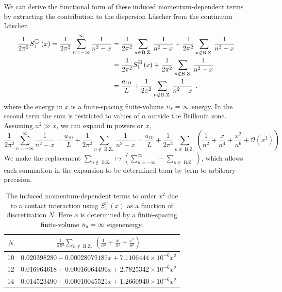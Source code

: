 We can derive the functional form of these induced momentum-dependent terms by extracting the contribution to the dispersion L\"uscher from the continuum L\"uscher.
\begin{align*}
 \frac{1}{2 \pi^{2}} S^\bigcirc_{1}\left(x\right)=\frac{1}{2 \pi^{2}} \sum_{n=-\infty}^{\infty} \frac{1}{n^{2}-x} &=\frac{1}{2 \pi^{2}} \sum_{n\in \operatorname{B.Z.}} \frac{1}{n^{2}-x} +\frac{1}{2 \pi^{2}} \sum_{n\notin \operatorname{B.Z.}} \frac{1}{n^{2}-x} \\
 &= \frac{1}{2 \pi^{2}} S^{\boxplus}_{1}\left(x\right)+\frac{1}{2 \pi^{2}} \sum_{n\notin \operatorname{B.Z.}} \frac{1}{n^{2}-x}\\
&=\frac{a_{10}}{L}+\frac{1}{2 \pi^{2}} \sum_{n\notin \operatorname{B.Z.}} \frac{1}{n^{2}-x} \ .
\end{align*}
where the energy in $x$ is a finite-spacing finite-volume ${n_s}=\infty$ energy.
In the second term the sum is restricted to values of $n$ outside the Brillouin zone.
Assuming $n^2\gg x$, we can expand in powers or $x$,
\begin{equation}
    \frac{1}{2 \pi^{2}} \sum_{n=-\infty}^{\infty} \frac{1}{n^{2}-x}
        =
    \frac{a_{10}}{L}+\frac{1}{2 \pi^{2}} \sum_{n\notin \operatorname{B.Z.}} \frac{1}{n^{2}-x}
        =
    \frac{a_{10}}{L}+\frac{1}{2 \pi^{2}} \sum_{n\notin \operatorname{B.Z.}} \left(\frac{1}{n^2}+\frac{x}{n^4}+\frac{x^2}{n^6}+\mathcal{O}(x^3)\right)
\end{equation}
We make the replacement $\sum_{n\notin\operatorname{B.Z.}}\mapsto\left(\sum_{n=-\infty}^\infty-\sum_{n\in\operatorname{B.Z.}}\right)$, which allows each summation in the expansion to be determined term by term to arbitrary precision.

\begin{table}
    \caption{
    The induced momentum-dependent terms to order $x^2$ due to a contact interaction using $S^\bigcirc_1(x)$ as a function of discretization $N$.
    Here $x$ is determined by a finite-spacing finite-volume ${n_s}=\infty$ eigenenergy.}
    \label{tab:induced terms in 1 d}
    \begin{tabular}{c|c}
    $N$
        &
            $\frac{1}{2 \pi^{2}} \sum_{n\notin \operatorname{B.Z.}} \left(\frac{1}{n^2}+\frac{x}{n^4}+\frac{x^2}{n^6}\right)$       \\
        \hline
    10  &   $0.020398280 + 0.00028079187 x + 7.1106444\times10^{-6} x^2$    \\
    12  &   $0.016964618 + 0.00016064496 x + 2.7825342\times10^{-6} x^2$    \\
    14  &   $0.014523490 + 0.00010045521 x + 1.2660940\times10^{-6} x^2$    \\
    \end{tabular}
\end{table}

